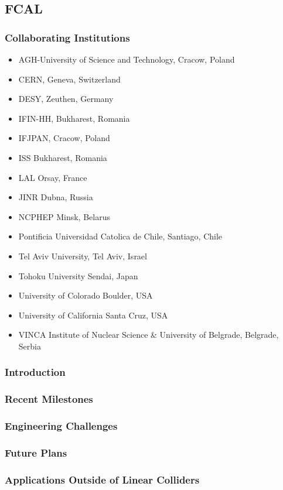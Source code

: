 \subsection{FCAL}
\subsubsection{Collaborating Institutions}
\begin{itemize}
	\item AGH-University of Science and Technology, Cracow, Poland
	\item CERN, Geneva, Switzerland 
	\item DESY, Zeuthen, Germany 
	\item IFIN-HH, Bukharest, Romania 
	\item IFJPAN, Cracow, Poland 
	\item ISS Bukharest, Romania 
	\item LAL Orsay, France 
	\item JINR Dubna, Russia 
	\item NCPHEP Minsk, Belarus 
	\item Pontificia Universidad Catolica de Chile, Santiago, Chile
	\item Tel Aviv University, Tel Aviv, Israel 
	\item Tohoku University Sendai, Japan 
	\item University of Colorado Boulder, USA 
	\item University of California Santa Cruz, USA 
	\item VINCA Institute of Nuclear Science \& University of Belgrade, Belgrade, Serbia
\end{itemize}
\subsubsection{Introduction}
\subsubsection{Recent Milestones}
\subsubsection{Engineering Challenges}
\subsubsection{Future Plans}
\subsubsection{Applications Outside of Linear Colliders}


